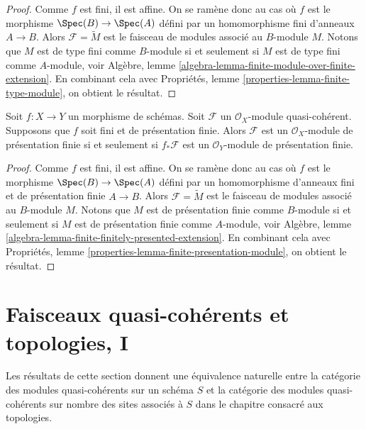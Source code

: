 \begin{proof}
Comme $f$ est fini, il est affine. On se ramène donc au cas où
$f$ est le morphisme $\Spec(B) \to \Spec(A)$ défini
par un homomorphisme fini d'anneaux $A \to B$.
Alors $\mathcal{F} = \widetilde{M}$ est le faisceau de modules
associé au $B$-module $M$.
Notons que $M$ est de type fini comme $B$-module si et seulement si
$M$ est de type fini comme $A$-module, voir
Algèbre, lemme \ref{algebra-lemma-finite-module-over-finite-extension}.
En combinant cela avec
Propriétés, lemme \ref{properties-lemma-finite-type-module},
on obtient le résultat.
\end{proof}

\begin{lemma}
\label{lemma-finite-finitely-presented-module}
Soit $f : X \to Y$ un morphisme de schémas.
Soit $\mathcal{F}$ un $\mathcal{O}_X$-module quasi-cohérent.
Supposons que $f$ soit fini et de présentation finie.
Alors $\mathcal{F}$ est un $\mathcal{O}_X$-module de présentation finie
si et seulement si $f_*\mathcal{F}$ est un $\mathcal{O}_Y$-module de présentation
finie.
\end{lemma}

\begin{proof}
Comme $f$ est fini, il est affine. On se ramène donc au cas où
$f$ est le morphisme $\Spec(B) \to \Spec(A)$ défini
par un homomorphisme d'anneaux fini et de présentation finie $A \to B$.
Alors $\mathcal{F} = \widetilde{M}$ est le faisceau de modules
associé au $B$-module $M$.
Notons que $M$ est de présentation finie comme $B$-module si et seulement si
$M$ est de présentation finie comme $A$-module, voir
Algèbre, lemme \ref{algebra-lemma-finite-finitely-presented-extension}.
En combinant cela avec
Propriétés, lemme \ref{properties-lemma-finite-presentation-module},
on obtient le résultat.
\end{proof}
















\section{Faisceaux quasi-cohérents et topologies, I}
\label{section-quasi-coherent-sheaves}

\noindent
Les résultats de cette section donnent une équivalence naturelle entre
la catégorie des modules quasi-cohérents sur un schéma $S$ et la catégorie
des modules quasi-cohérents sur nombre des sites associés à $S$
dans le chapitre consacré aux topologies.

